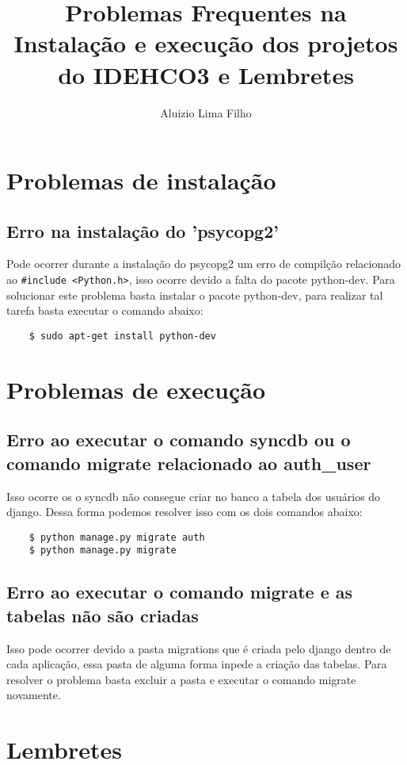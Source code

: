 \documentclass[12pt,a4paper]{article}
\title{Problemas Frequentes na Instalação e execução dos projetos do IDEHCO3 e Lembretes}
\author{Aluizio Lima Filho}
\begin{document}
	
\maketitle

\section{Problemas de instalação}

\subsection{Erro na instalação do 'psycopg2'}
Pode ocorrer durante a instalação do psycopg2 um erro de compilção relacionado ao \verb|#include <Python.h>|, isso ocorre devido a falta do pacote python-dev.
Para solucionar este problema basta instalar o pacote python-dev,
para realizar tal tarefa basta executar o comando abaixo:
\begin{verbatim}
	$ sudo apt-get install python-dev
\end{verbatim}


\section{Problemas de execução}

\subsection{Erro ao executar o comando syncdb ou o comando migrate relacionado ao auth\_user}
Isso ocorre os o syncdb não consegue criar no banco a tabela dos usuários do django. Dessa forma podemos resolver isso com os dois comandos abaixo:

\begin{verbatim}
	$ python manage.py migrate auth
	$ python manage.py migrate
\end{verbatim}

\subsection{Erro ao executar o comando migrate e as tabelas não são criadas}
Isso pode ocorrer devido a pasta migrations que é criada pelo django dentro de cada aplicação, essa pasta de alguma forma inpede a criação das tabelas. Para resolver o problema basta excluir a pasta e executar o comando migrate novamente.

\section{Lembretes}
\end{document}
